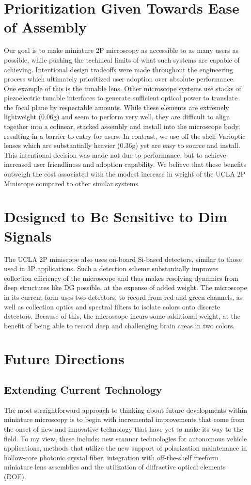\documentclass [PhD] {UCLAthesis}
\begin{document}
\section{Prioritization Given Towards Ease of Assembly}
Our goal is to make miniature 2P microscopy as accessible to as many users as possible, while pushing the technical limits of what such systems are capable of achieving. Intentional design tradeoffs were made throughout the engineering process which ultimately prioritized user adoption over absolute performance. One example of this is the tunable lens. Other microscope systems use stacks of piezoelectric tunable interfaces to generate sufficient optical power to translate the focal plane by respectable amounts. While these elements are extremely lightweight (0.06g) and seem to perform very well, they are difficult to align together into a colinear, stacked assembly and install into the microscope body, resulting in a barrier to entry for users. In contrast, we use off-the-shelf Varioptic lenses which are substantially heavier (0.36g) yet are easy to source and install. This intentional decision was made not due to performance, but to achieve increased user friendliness and adoption capability. We believe that these benefits outweigh the cost associated with the modest increase in weight of the UCLA 2P Miniscope compared to other similar systems. 

\section{Designed to Be Sensitive to Dim Signals}
The UCLA 2P miniscope also uses on-board Si-based detectors, similar to those used in 3P applications. Such a detection scheme substantially improves collection efficiency of the microscope and thus makes resolving dynamics from deep structures like DG possible, at the expense of added weight. The microscope in its current form uses two detectors, to record from red and green channels, as well as collection optics and spectral filters to isolate colors onto discrete detectors. Because of this, the microscope incurs some additional weight, at the benefit of being able to record deep and challenging brain areas in two colors. 


\section{Future Directions}
\subsection{Extending Current Technology}
The most straightforward approach to thinking about future developments within miniature microscopy is to begin with incremental improvements that come from the onset of new and innovative technology that have yet to make its way to the field. To my view, these include: new scanner technologies for autonomous vehicle applications, methods that utilize the new support of polarization maintenance in hollow-core photonic crystal fiber, integration with off-the-shelf freeform miniature lens assemblies and the utilization of diffractive optical elements (DOE). 
\\
\end{document}
